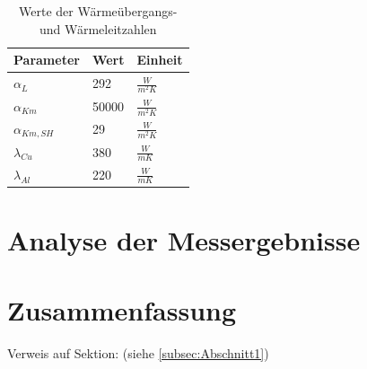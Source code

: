 \begin{table}[]
\centering
\caption{Werte der Wärmeübergangs- und Wärmeleitzahlen}
\label{tab:Werte der Wärmeübergangs- und Wärmeleitzahlen}
\renewcommand{\arraystretch}{1.2}
\begin{tabular}{|l|l|l|}

\hline
Parameter        & Wert  & Einheit           \\ \hline
$\alpha_{L}$     & 292   & $\frac{W}{m^2 K}$ \\
$\alpha_{Km}$    & 50000 & $\frac{W}{m^2 K}$ \\
$\alpha_{Km,SH}$ & 29    & $\frac{W}{m^2 K}$ \\
$\lambda_{Cu}$   & 380   & $\frac{W}{m K}$   \\
$\lambda_{Al}$   & 220   & $\frac{W}{m K}$   \\ \hline
\end{tabular}
\end{table}

\chapter{Analyse der Messergebnisse}
\label{cha:Analyse der Messergebnisse}

\chapter{Zusammenfassung}
\label{cha:Zusammenfassung}
Verweis auf Sektion: (siehe \ref{subsec:Abschnitt1})